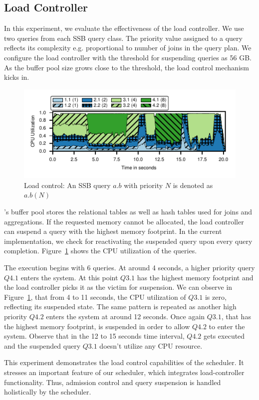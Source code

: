 \subsection{Load Controller}
In this experiment, we evaluate the effectiveness of the load controller.
We use two queries from each SSB query class.
The priority value assigned to a query reflects its complexity e.g. proportional to number of joins in the query plan.
We configure the load controller with the threshold for suspending queries as 56 GB. 
As the buffer pool size grows close to the threshold, the load control mechanism kicks in.

\begin{figure}[]
	\centering
	\includegraphics[width=0.6\textheight]{policy/figures/load-control-cpu-util.pdf}
	\caption{Load control: An SSB query $a.b$ with priority $N$ is denoted as $a.b (N)$}
	\label{fig:load-control-cpu-util}
\end{figure}

\sys{}'s buffer pool stores the relational tables as well as hash tables used for joins and aggregations.
If the requested memory cannot be allocated, the load controller can suspend a query with the highest memory footprint. 
In the current implementation, we check for reactivating the suspended query upon every query completion. %
Figure~\ref{fig:load-control-cpu-util} shows the CPU utilization of the queries.

The execution begins with 6 queries.
At around 4 seconds, a higher priority query $Q4.1$ enters the system.
At this point $Q3.1$ has the highest memory footprint and the load controller
picks it as the victim for suspension.
We can observe in Figure~\ref{fig:load-control-cpu-util}, that from 4 to 11 seconds, the CPU utilization of $Q3.1$ is zero, reflecting its suspended state.
The same pattern is repeated as another high priority $Q4.2$ enters the system at around 12 seconds.
Once again $Q3.1$, that has the highest memory footprint, is suspended in order to allow $Q4.2$ to enter the system. 
Observe that in the 12 to 15 seconds time interval, $Q4.2$ gets executed and the suspended query $Q3.1$ doesn't utilize any CPU resource.

This experiment demonstrates the load control capabilities of the \sys{}
scheduler. 
It stresses an important feature of our scheduler, which integrates load-controller functionality. %
Thus, admission control and query suspension is handled holistically by the scheduler. 
